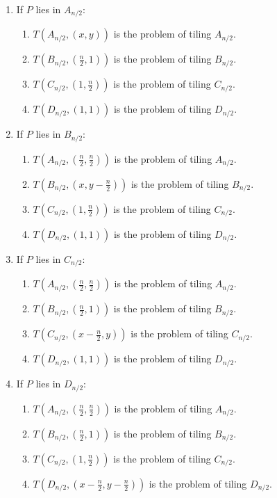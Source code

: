\documentclass[12pt]{report}
\begin{document}
    \begin{enumerate}
        \item
        If $P$ lies in $A_{n/2}$:
        \begin{enumerate}
            \item $T\left(A_{n/2}, \left(x, y\right)\right)$ is the problem of tiling $A_{n/2}$.
            \item $T\left(B_{n/2}, \left(\frac{n}{2}, 1\right)\right)$ is the problem of tiling $B_{n/2}$.
            \item $T\left(C_{n/2}, \left(1, \frac{n}{2}\right)\right)$ is the problem of tiling $C_{n/2}$.
            \item $T\left(D_{n/2}, \left(1, 1\right)\right)$ is the problem of tiling $D_{n/2}$.
        \end{enumerate}
        \item
        If $P$ lies in $B_{n/2}$:
        \begin{enumerate}
            \item $T\left(A_{n/2}, \left(\frac{n}{2}, \frac{n}{2}\right)\right)$ is the problem of tiling $A_{n/2}$.
            \item $T\left(B_{n/2}, \left(x, y-\frac{n}{2}\right)\right)$ is the problem of tiling $B_{n/2}$.
            \item $T\left(C_{n/2}, \left(1, \frac{n}{2}\right)\right)$ is the problem of tiling $C_{n/2}$.
            \item $T\left(D_{n/2}, \left(1, 1\right)\right)$ is the problem of tiling $D_{n/2}$.
        \end{enumerate}
        \item
        If $P$ lies in $C_{n/2}$:
        \begin{enumerate}
            \item $T\left(A_{n/2}, \left(\frac{n}{2}, \frac{n}{2}\right)\right)$ is the problem of tiling $A_{n/2}$.
            \item $T\left(B_{n/2}, \left(\frac{n}{2}, 1\right)\right)$ is the problem of tiling $B_{n/2}$.
            \item $T\left(C_{n/2}, \left(x-\frac{n}{2}, y\right)\right)$ is the problem of tiling $C_{n/2}$.
            \item $T\left(D_{n/2}, \left(1, 1\right)\right)$ is the problem of tiling $D_{n/2}$.
        \end{enumerate}
        \item
        If $P$ lies in $D_{n/2}$:
        \begin{enumerate}
            \item $T\left(A_{n/2}, \left(\frac{n}{2}, \frac{n}{2}\right)\right)$ is the problem of tiling $A_{n/2}$.
            \item $T\left(B_{n/2}, \left(\frac{n}{2}, 1\right)\right)$ is the problem of tiling $B_{n/2}$.
            \item $T\left(C_{n/2}, \left(1, \frac{n}{2}\right)\right)$ is the problem of tiling $C_{n/2}$.
            \item $T\left(D_{n/2}, \left(x-\frac{n}{2}, y-\frac{n}{2}\right)\right)$ is the problem of tiling $D_{n/2}$.
        \end{enumerate}
    \end{enumerate}
\end{document}
